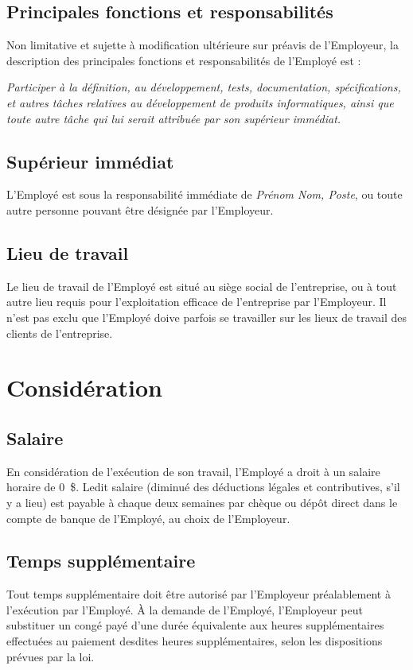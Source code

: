 \documentclass{article}
\newcommand{\tofill}[1]{\emph{#1}}
\begin{document}
    	\subsection{Principales fonctions et responsabilités}
    	Non limitative et sujette à modification ultérieure sur préavis de l'Employeur, la description des principales fonctions et responsabilités de l'Employé est :
    	
    	\emph{Participer à la définition, au développement, tests, documentation, spécifications, et autres tâches relatives au développement de produits informatiques, ainsi que toute autre tâche qui lui serait attribuée par son supérieur immédiat.}
    	
    	\subsection{Supérieur immédiat}
    	L'Employé est sous la responsabilité immédiate de \tofill{Prénom Nom, Poste}, ou toute autre personne pouvant être désignée par l'Employeur.
    	
    	\subsection{Lieu de travail}
    	Le lieu de travail de l'Employé est situé au siège social de l'entreprise, ou à tout autre lieu requis pour l'exploitation efficace de l'entreprise par l'Employeur. Il n'est pas exclu que l'Employé doive parfois se travailler sur les lieux de travail des clients de l'entreprise.
    
    \section{Considération}
    	\subsection{Salaire}
    	En considération de l'exécution de son travail, l'Employé a droit à un salaire horaire de \SI{0}{\$}. Ledit salaire (diminué des déductions légales et contributives, s'il y a lieu) est payable à chaque deux semaines par chèque ou dépôt direct dans le compte de banque de l'Employé, au choix de l'Employeur.
    	
    	\subsection{Temps supplémentaire}
    	Tout temps supplémentaire doit être autorisé par l'Employeur préalablement à l'exécution par l'Employé. À la demande de l'Employé, l'Employeur peut substituer un congé payé d'une durée équivalente aux heures supplémentaires effectuées au paiement desdites heures supplémentaires, selon les dispositions prévues par la loi.
    	
\end{document}
